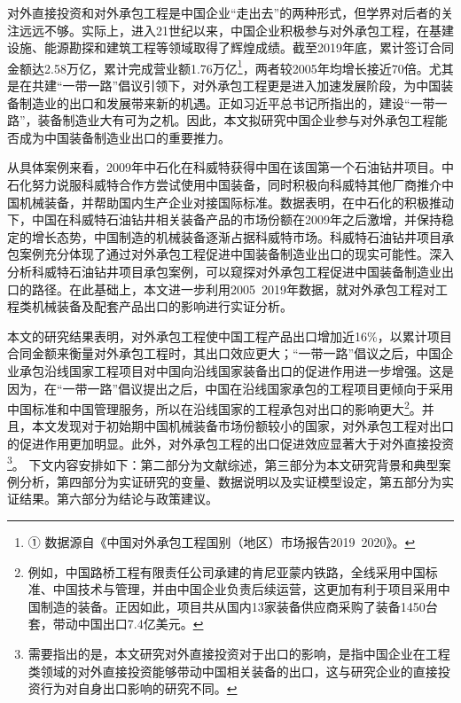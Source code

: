 \documentclass[a4paper,12pt]{article}
\begin{document}
对外直接投资和对外承包工程是中国企业“走出去”的两种形式，但学界对后者的关注远远不够。实际上，进入21世纪以来，中国企业积极参与对外承包工程，在基建设施、能源勘探和建筑工程等领域取得了辉煌成绩。截至2019年底，累计签订合同金额达2.58万亿，累计完成营业额1.76万亿\footnote{①	数据源自《中国对外承包工程国别（地区）市场报告2019~2020》。}，两者较2005年均增长接近70倍。尤其是在共建“一带一路”倡议引领下，对外承包工程更是进入加速发展阶段，为中国装备制造业的出口和发展带来新的机遇。正如习近平总书记所指出的，建设“一带一路”，装备制造业大有可为之机。因此，本文拟研究中国企业参与对外承包工程能否成为中国装备制造业出口的重要推力。

	\vspace{0.5em}  %
	
从具体案例来看，2009年中石化在科威特获得中国在该国第一个石油钻井项目。中石化努力说服科威特合作方尝试使用中国装备，同时积极向科威特其他厂商推介中国机械装备，并帮助国内生产企业对接国际标准。数据表明，在中石化的积极推动下，中国在科威特石油钻井相关装备产品的市场份额在2009年之后激增，并保持稳定的增长态势，中国制造的机械装备逐渐占据科威特市场。科威特石油钻井项目承包案例充分体现了通过对外承包工程促进中国装备制造业出口的现实可能性。深入分析科威特石油钻井项目承包案例，可以窥探对外承包工程促进中国装备制造业出口的路径。在此基础上，本文进一步利用2005~2019年数据，就对外承包工程对工程类机械装备及配套产品出口的影响进行实证分析。

	\vspace{0.5em}  %
	
本文的研究结果表明，对外承包工程使中国工程产品出口增加近16\%，以累计项目合同金额来衡量对外承包工程时，其出口效应更大；“一带一路”倡议之后，中国企业承包沿线国家工程项目对中国向沿线国家装备出口的促进作用进一步增强。这是因为，在“一带一路”倡议提出之后，中国在沿线国家承包的工程项目更倾向于采用中国标准和中国管理服务，所以在沿线国家的工程承包对出口的影响更大\footnote{例如，中国路桥工程有限责任公司承建的肯尼亚蒙内铁路，全线采用中国标准、中国技术与管理，并由中国企业负责后续运营，这更加有利于项目采用中国制造的装备。正因如此，项目共从国内13家装备供应商采购了装备1450台套，带动中国出口7.4亿美元。}。并且，本文发现对于初始期中国机械装备市场份额较小的国家，对外承包工程对出口的促进作用更加明显。此外，对外承包工程的出口促进效应显著大于对外直接投资\footnote{需要指出的是，本文研究对外直接投资对于出口的影响，是指中国企业在工程类领域的对外直接投资能够带动中国相关装备的出口，这与研究企业的直接投资行为对自身出口影响的研究不同。}。
下文内容安排如下：第二部分为文献综述，第三部分为本文研究背景和典型案例分析，第四部分为实证研究的变量、数据说明以及实证模型设定，第五部分为实证结果。第六部分为结论与政策建议。
\end{document}
